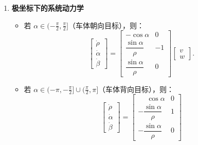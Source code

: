 \documentclass[../main.tex]{subfiles}
\begin{document}
\begin{enumerate}
\begin{itemize}
{\begin{enumerate}
                                \item \textbf{极坐标下的系统动力学}\\
                                \begin{itemize}
                                    \item 若 $\alpha \in (-\tfrac{\pi}{2}, \tfrac{\pi}{2}]$（车体朝向目标），则：
                                    \[
                                    \begin{bmatrix}
                                        \dot{\rho} \\[2pt] \dot{\alpha} \\[2pt] \dot{\beta}
                                    \end{bmatrix}
                                    =
                                    \begin{bmatrix}
                                        -\cos\alpha & 0 \\[4pt]
                                        \dfrac{\sin\alpha}{\rho} & -1 \\[8pt]
                                        \dfrac{\sin\alpha}{\rho} & 0
                                    \end{bmatrix}
                                    \begin{bmatrix}
                                        v \\[2pt] w
                                    \end{bmatrix}.
                                    \]
                                    \item 若 $\alpha \in (-\pi, -\tfrac{\pi}{2}] \cup (\tfrac{\pi}{2}, \pi]$（车体背向目标），则：
                                    \[
                                    \begin{bmatrix}
                                        \dot{\rho} \\[2pt] \dot{\alpha} \\[2pt] \dot{\beta}
                                    \end{bmatrix}
                                    =
                                    \begin{bmatrix}
                                        \phantom{-}\cos\alpha & 0 \\[4pt]
                                        -\dfrac{\sin\alpha}{\rho} & 1 \\[8pt]
                                        -\dfrac{\sin\alpha}{\rho} & 0

\end{bmatrix}\]
\end{itemize}
\end{enumerate}}
\end{itemize}
\end{enumerate}
\end{document}
